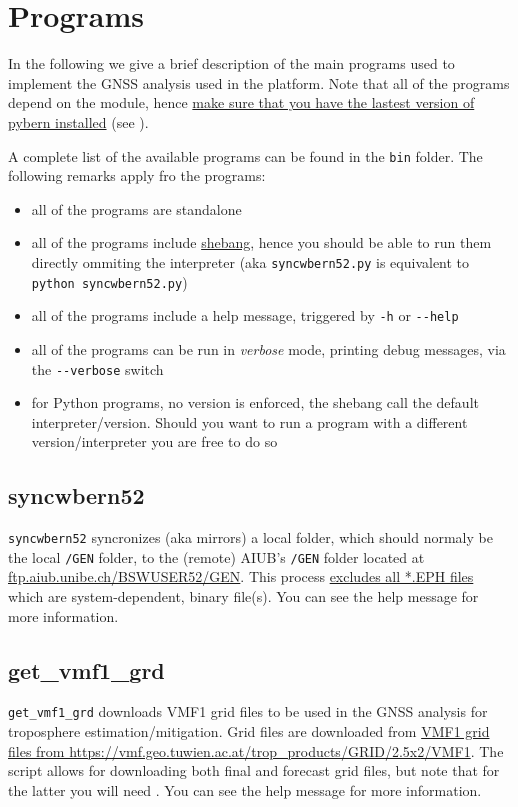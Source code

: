 \chapter{Programs}
\label{ch:programs}

In the following we give a brief description of the main programs used to 
implement the GNSS analysis used in the platform. Note that all of the programs 
depend on the  module, hence \ul{make sure that you have 
the lastest version of pybern installed} (see ).

A complete list of the available programs can be found in the \verb|bin| folder. 
The following remarks apply fro the programs:
\begin{itemize}
    \item all of the programs are standalone
    \item all of the programs include \href{https://en.wikipedia.org/wiki/Shebang_(Unix)}{shebang}, 
    hence you should be able to run them directly ommiting the interpreter (aka 
    \verb|syncwbern52.py| is equivalent to \verb|python syncwbern52.py|)
    \item all of the programs include a help message, triggered by \verb|-h| or 
    \verb|--help|
    \item all of the programs can be run in \emph{verbose} mode, printing debug messages, via 
    the \verb|--verbose| switch
    \item for Python programs, no version is enforced, the shebang call the default 
    interpreter/version. Should you want to run a program with a different version/interpreter 
    you are free to do so
\end{itemize}

\section{syncwbern52}
\label{sec:programs-syncwbern52}
\verb|syncwbern52| syncronizes (aka mirrors) a local folder, which should normaly 
be the local \verb|/GEN| folder, to the (remote) AIUB's \verb|/GEN| folder 
located at \url{ftp.aiub.unibe.ch/BSWUSER52/GEN}. This process 
\ul{excludes all *.EPH files} which are system-dependent, binary file(s).
You can see the help message for more information.

\section{get\_vmf1\_grd}
\label{sec:programs-get-vmf1-grd}
\verb|get_vmf1_grd| downloads VMF1 grid files to be used in the GNSS analysis 
for troposphere estimation/mitigation. Grid files are downloaded from 
\url{VMF1 grid files from https://vmf.geo.tuwien.ac.at/trop_products/GRID/2.5x2/VMF1}.
The script allows for downloading both final and forecast grid files, but note that 
for the latter you will need . You can see the 
help message for more information.


